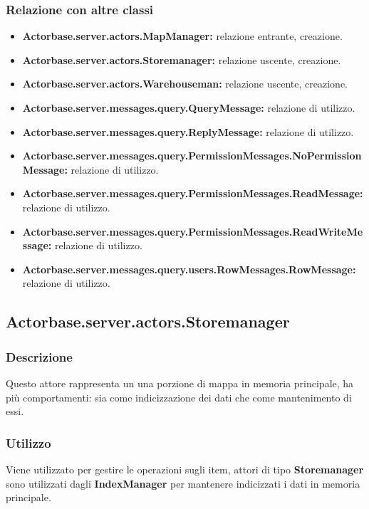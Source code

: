 \documentclass[a4paper]{article}
\begin{document}
			\subsubsection{Relazione con altre classi}
				\begin{itemize}
					\item \textbf{Actorbase.server.actors.MapManager:} relazione entrante, creazione.
					\item \textbf{Actorbase.server.actors.Storemanager:} relazione uscente, creazione.
					\item \textbf{Actorbase.server.actors.Warehouseman:} relazione uscente, creazione.
					\item \textbf{Actorbase.server.messages.query.QueryMessage:} relazione di utilizzo.
					\item \textbf{Actorbase.server.messages.query.ReplyMessage:} relazione di utilizzo.
					\item \textbf{Actorbase.server.messages.query.PermissionMessages.NoPermissionMessage:} relazione di utilizzo.
					\item \textbf{Actorbase.server.messages.query.PermissionMessages.ReadMessage:} relazione di utilizzo.
					\item \textbf{Actorbase.server.messages.query.PermissionMessages.ReadWriteMessage:} relazione di utilizzo.
					\item \textbf{Actorbase.server.messages.query.users.RowMessages.RowMessage:} relazione di utilizzo.
				\end{itemize}
				
		\subsection{Actorbase.server.actors.Storemanager}
			\subsubsection{Descrizione}
				Questo attore rappresenta un una porzione di mappa in memoria principale, ha più comportamenti: sia come indicizzazione dei dati che come mantenimento di essi. 
				
			\subsubsection{Utilizzo}
				Viene utilizzato per gestire le operazioni sugli item, attori di tipo \textbf{Storemanager} sono utilizzati dagli \textbf{IndexManager} per mantenere indicizzati i dati in memoria principale.
				
\end{document}
